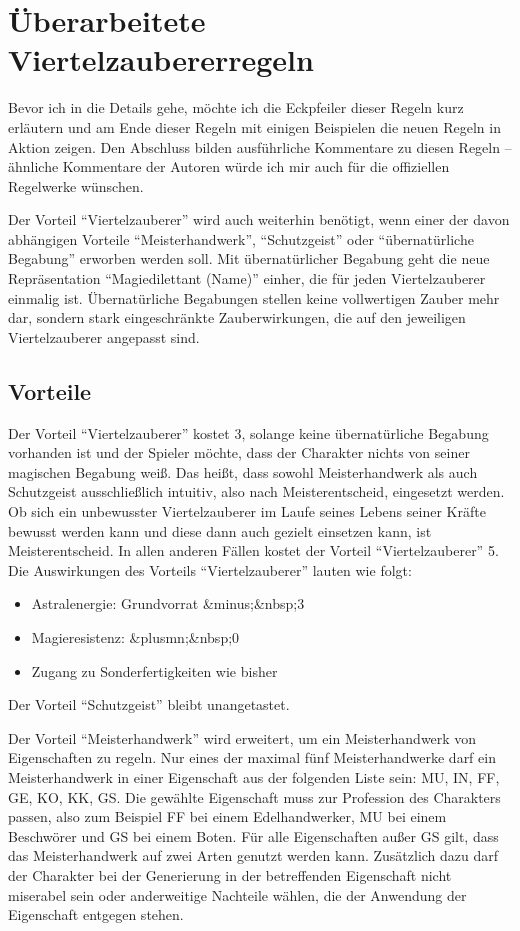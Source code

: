 \section{Überarbeitete Viertelzaubererregeln}
Bevor ich in die Details gehe, möchte ich die Eckpfeiler dieser Regeln kurz erläutern und am Ende dieser Regeln mit einigen Beispielen die neuen Regeln in Aktion zeigen. Den Abschluss bilden ausführliche Kommentare zu diesen Regeln -- ähnliche Kommentare der Autoren würde ich mir auch für die offiziellen Regelwerke wünschen.

Der Vorteil \enquote{Viertelzauberer} wird auch weiterhin benötigt, wenn einer der davon abhängigen Vorteile \enquote{Meisterhandwerk}, \enquote{Schutzgeist} oder \enquote{übernatürliche Begabung} erworben werden soll. Mit übernatürlicher Begabung geht die neue Repräsentation \enquote{Magiedilettant (Name)} einher, die für jeden Viertelzauberer einmalig ist. Übernatürliche Begabungen stellen keine vollwertigen Zauber mehr dar, sondern stark eingeschränkte Zauberwirkungen, die auf den jeweiligen Viertelzauberer angepasst sind.

\subsection{Vorteile}
Der Vorteil \enquote{Viertelzauberer} kostet \SI{3}{\GP}, solange keine übernatürliche Begabung vorhanden ist und der Spieler möchte, dass der Charakter nichts von seiner magischen Begabung weiß. Das heißt, dass sowohl Meisterhandwerk als auch Schutzgeist ausschließlich intuitiv, also nach Meisterentscheid, eingesetzt werden. Ob sich ein unbewusster Viertelzauberer im Laufe seines Lebens seiner Kräfte bewusst werden kann und diese dann auch gezielt einsetzen kann, ist Meisterentscheid. In allen anderen Fällen kostet der Vorteil \enquote{Viertelzauberer} \SI{5}{\GP}. Die Auswirkungen des Vorteils \enquote{Viertelzauberer} lauten wie folgt:
\begin{itemize}
	\item Astralenergie: Grundvorrat &minus;&nbsp;\SI{3}{\AsP}
	\item Magieresistenz: &plusmn;&nbsp;0
	\item Zugang zu Sonderfertigkeiten wie bisher
\end{itemize}
Der Vorteil \enquote{Schutzgeist} bleibt unangetastet.

Der Vorteil \enquote{Meisterhandwerk} wird erweitert, um ein Meisterhandwerk von Eigenschaften zu regeln. Nur eines der maximal fünf Meisterhandwerke darf ein Meisterhandwerk in einer Eigenschaft aus der folgenden Liste sein: MU, IN, FF, GE, KO, KK, GS. Die gewählte Eigenschaft muss zur Profession des Charakters passen, also zum Beispiel FF bei einem Edelhandwerker, MU bei einem Beschwörer und GS bei einem Boten. Für alle Eigenschaften außer GS gilt, dass das Meisterhandwerk auf zwei Arten genutzt werden kann. Zusätzlich dazu darf der Charakter bei der Generierung in der betreffenden Eigenschaft nicht miserabel sein oder anderweitige Nachteile wählen, die der Anwendung der Eigenschaft entgegen stehen.

